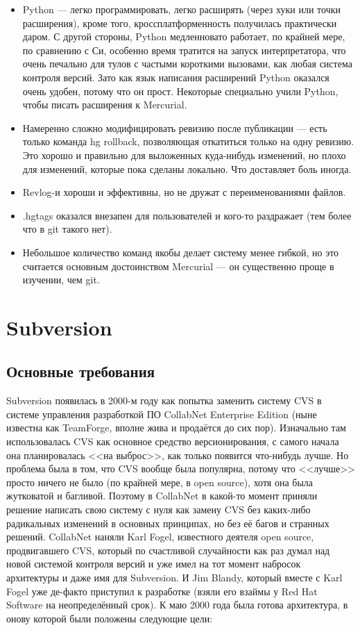 \documentclass[a5paper]{article}
\begin{document}
\begin{itemize}
    \item Python --- легко программировать, легко расширять (через хуки или точки расширения), кроме того, кроссплатформенность получилась практически даром. С другой стороны, Python медленновато работает, по крайней мере, по сравнению с Си, особенно время тратится на запуск интерпретатора, что очень печально для тулов с частыми короткими вызовами, как любая система контроля версий. Зато как язык написания расширений Python оказался очень удобен, потому что он прост. Некоторые специально учили Python, чтобы писать расширения к Mercurial.
    \item Намеренно сложно модифицировать ревизию после публикации --- есть только команда hg rollback, позволяющая откатиться только на одну ревизию. Это хорошо и правильно для выложенных куда-нибудь изменений, но плохо для изменений, которые пока сделаны локально. Что доставляет боль иногда.
    \item Revlog-и хороши и эффективны, но не дружат с переименованиями файлов.
    \item .hgtags оказался внезапен для пользователей и кого-то раздражает (тем более что в git такого нет).
    \item Небольшое количество команд якобы делает систему менее гибкой, но это считается основным достоинством Mercurial --- он существенно проще в изучении, чем git.
\end{itemize}

\section{Subversion}

\subsection{Основные требования}

Subversion появилась в 2000-м году как попытка заменить систему CVS в системе управления разработкой ПО CollabNet Enterprise Edition (ныне известна как TeamForge, вполне жива и продаётся до сих пор). Изначально там использовалась CVS как основное средство версионирования, с самого начала она планировалась <<на выброс>>, как только появится что-нибудь лучше. Но проблема была в том, что CVS вообще была популярна, потому что <<лучше>> просто ничего не было (по крайней мере, в open source), хотя она была жутковатой и багливой. Поэтому в CollabNet в какой-то момент приняли решение написать свою систему с нуля как замену CVS без каких-либо радикальных изменений в основных принципах, но без её багов и странных решений. CollabNet наняли Karl Fogel, известного деятеля open source, продвигавшего CVS, который по счастливой случайности как раз думал над новой системой контроля версий и уже имел на тот момент набросок архитектуры и даже имя для Subversion. И Jim Blandy, который вместе с Karl Fogel уже де-факто приступил к разработке (взяли его взаймы у Red Hat Software на неопределённый срок). К маю 2000 года была готова архитектура, в онову которой были положены следующие цели:
\end{document}
